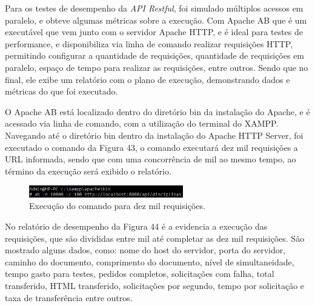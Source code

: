      Para os testes de desempenho da \textit{API Restful}, foi simulado múltiplos acessos em paralelo, e obteve algumas métricas sobre a execução. Com Apache AB que é um executável que vem junto com o servidor Apache HTTP, e é ideal para testes de performance, e disponibiliza via linha de comando realizar requisições HTTP, permitindo configurar a quantidade de requisições, quantidade de requisições em paralelo, espaço de tempo para realizar as requisições, entre outros. Sendo que no final, ele exibe um relatório com o plano de execução, demonstrando dados e métricas do que foi executado. 

    O Apache AB está localizado dentro do diretório bin da instalação do Apache, e é acessado via linha de comando, com a utilização do terminal do XAMPP. Navegando até o diretório bin dentro da instalação do Apache HTTP Server, foi executado o comando da Figura 43, o comando executará dez mil requisições a URL informada, sendo que com uma concorrência de mil ao mesmo tempo,  ao término da execução será exibido o relatório.
    
        \begin{figure}[h]
        \centering
        \includegraphics[width=0.60\textwidth]{./img/ComadoRequisicoes.png}
        \caption{Execução do comando para dez mil requisições.}
        \label{fig:ComadoRequisicoes}
        \end{figure}
        
    No relatório de desempenho da Figura 44 é a evidencia a execução das requisições, que são divididas entre mil até completar as dez mil requisições. São mostrado alguns dados, como: nome do host do servidor, porta do servidor, caminho do documento, comprimento do documento, nível de simultaneidade, tempo gasto para testes, pedidos completos, solicitações com falha, total transferido, HTML transferido, solicitações por segundo, tempo por solicitação e taxa de transferência entre outros.

